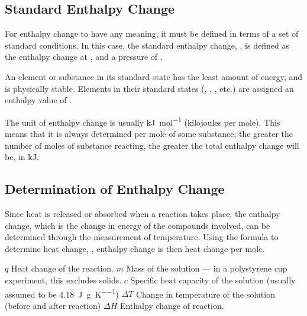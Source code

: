 
		\subsection{Standard Enthalpy Change}

			For enthalpy change to have any meaning, it must be defined in terms of a set of standard conditions. In this case, the standard
			enthalpy change, \enthStd{}, is defined as the enthalpy change at , and a pressure of .

			An element or substance in its standard state has the least amount of energy, and is physically stable. Elements in their standard
			states (, , , etc.) are assigned an enthalpy value of .

			The unit of enthalpy change is usually \si{\kilo\joule\per\mole} (kilojoules per mole). This means that it is always determined
			per mole of some substance; the greater the number of moles of substance reacting, the greater the total enthalpy change will be,
			in \si{\kilo\joule}.


		\subsection{Determination of Enthalpy Change}

			Since heat is released or absorbed when a reaction takes place, the enthalpy change, which is the change in energy of the compounds
			involved, can be determined through the measurement of temperature. Using the formula to determine heat change, , enthalpy change
			is then heat change per mole.

			\vspace{5mm}

			\parbox{\textwidth}{
				\tabto{0mm}$q$          \tabto{15mm}  Heat change of the reaction.
				\tabto{0mm}$m$          \tabto{15mm}  Mass of the solution — in a polystyrene cup experiment, this excludes solids.
				\tabto{0mm}$c$          \tabto{15mm}  Specific heat capacity of the solution (usually assumed to be \SI{4.18}{\joule\per\gram\per\kelvin})
				\tabto{0mm}$\Delta T$   \tabto{15mm}  Change in temperature of the solution (before and after reaction)
				\tabto{0mm}$\Delta H$   \tabto{15mm}  Enthalpy change of reaction.
			}

